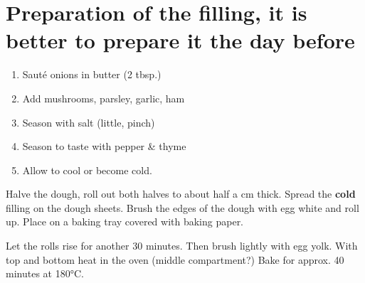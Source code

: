 \chapter{Preparation of the filling, it is better to prepare it the day before}
\begin{enumerate}
  \item{Sauté onions in butter (2 tbsp.)}
  \item{Add mushrooms, parsley, garlic, ham}
  \item{Season with salt (little, pinch)}
  \item{Season to taste with pepper \& thyme}
  \item{Allow to cool or become cold.}
\end{enumerate}
Halve the dough, roll out both halves to about half a cm thick.
Spread the \textbf{cold} filling on the dough sheets.
Brush the edges of the dough with egg white and roll up.
Place on a baking tray covered with baking paper.
\begin{flushleft}
Let the rolls rise for another 30 minutes.
Then brush lightly with egg yolk.
With top and bottom heat in the oven (middle compartment?)
Bake for approx. 40 minutes at 180°C.
\end{flushleft}
